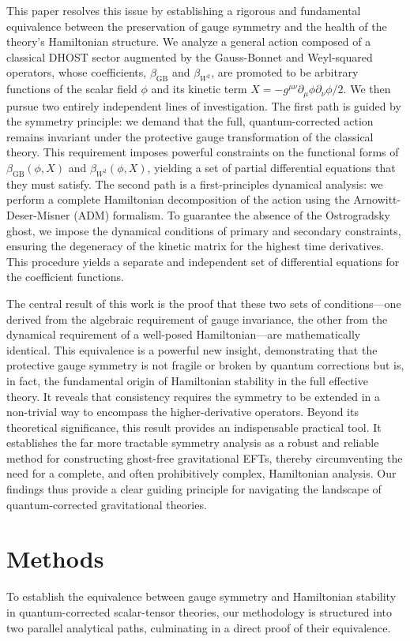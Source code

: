 \documentclass[twocolumn]{aastex631}
\begin{document}
This paper resolves this issue by establishing a rigorous and fundamental equivalence between the preservation of gauge symmetry and the health of the theory's Hamiltonian structure. We analyze a general action composed of a classical DHOST sector augmented by the Gauss-Bonnet and Weyl-squared operators, whose coefficients, $\beta_{\text{GB}}$ and $\beta_{W^2}$, are promoted to be arbitrary functions of the scalar field $\phi$ and its kinetic term $X = -g^{\mu\nu}\partial_\mu\phi\partial_\nu\phi/2$. We then pursue two entirely independent lines of investigation. The first path is guided by the symmetry principle: we demand that the full, quantum-corrected action remains invariant under the protective gauge transformation of the classical theory. This requirement imposes powerful constraints on the functional forms of $\beta_{\text{GB}}(\phi, X)$ and $\beta_{W^2}(\phi, X)$, yielding a set of partial differential equations that they must satisfy. The second path is a first-principles dynamical analysis: we perform a complete Hamiltonian decomposition of the action using the Arnowitt-Deser-Misner (ADM) formalism. To guarantee the absence of the Ostrogradsky ghost, we impose the dynamical conditions of primary and secondary constraints, ensuring the degeneracy of the kinetic matrix for the highest time derivatives. This procedure yields a separate and independent set of differential equations for the coefficient functions.

The central result of this work is the proof that these two sets of conditions---one derived from the algebraic requirement of gauge invariance, the other from the dynamical requirement of a well-posed Hamiltonian---are mathematically identical. This equivalence is a powerful new insight, demonstrating that the protective gauge symmetry is not fragile or broken by quantum corrections but is, in fact, the fundamental origin of Hamiltonian stability in the full effective theory. It reveals that consistency requires the symmetry to be extended in a non-trivial way to encompass the higher-derivative operators. Beyond its theoretical significance, this result provides an indispensable practical tool. It establishes the far more tractable symmetry analysis as a robust and reliable method for constructing ghost-free gravitational EFTs, thereby circumventing the need for a complete, and often prohibitively complex, Hamiltonian analysis. Our findings thus provide a clear guiding principle for navigating the landscape of quantum-corrected gravitational theories.

\section{Methods}
\label{sec:methods}
To establish the equivalence between gauge symmetry and Hamiltonian stability in quantum-corrected scalar-tensor theories, our methodology is structured into two parallel analytical paths, culminating in a direct proof of their equivalence.
\end{document}
